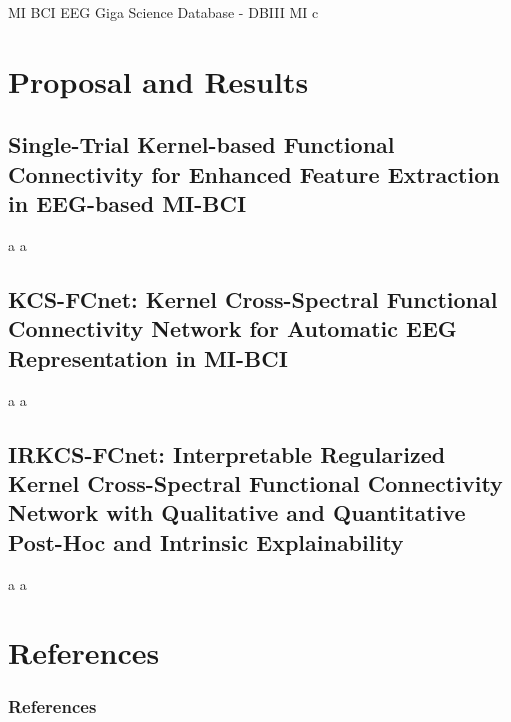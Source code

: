 \documentclass[aspectratio=169]{beamer}
\let\oldcite\cite %
\renewcommand{\cite}[1]{{\tiny\oldcite{#1}}}
\begin{document}
\begin{frame}{MI BCI EEG Giga Science Database - DBIII MI}
    c
\end{frame}

\section{Proposal and Results}

\subsection{Single-Trial Kernel-based Functional Connectivity for Enhanced Feature Extraction in EEG-based MI-BCI}

\begin{frame}{a}
    a
\end{frame}

\subsection{KCS-FCnet: Kernel Cross-Spectral Functional Connectivity Network for Automatic EEG Representation in MI-BCI}

\begin{frame}{a}
    a
\end{frame}

\subsection{IRKCS-FCnet: Interpretable Regularized Kernel Cross-Spectral Functional Connectivity Network with Qualitative and Quantitative Post-Hoc and Intrinsic Explainability}

\begin{frame}{a}
    a
\end{frame}


\section{References}
\begin{frame}[allowframebreaks]%
\frametitle{References}
{\tiny 


}
\end{frame}
\end{document}
